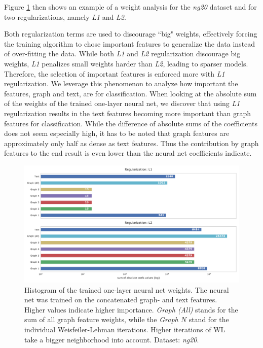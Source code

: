 Figure \ref{fig:combined_coefs_l1_l2_regularization} then shows an example of a weight analysis for the \textit{ng20} dataset and for two regularizations, namely \textit{L1} and \textit{L2}.

Both regularization terms are used to discourage ``big" weights, effectively forcing the training algorithm to chose important features to generalize the data instead of over-fitting the data.
While both \textit{L1} and \textit{L2} regularization discourage big weights, \textit{L1} penalizes small weights harder than \textit{L2}, leading to sparser models.
Therefore, the selection of important features is enforced more with \textit{L1} regularization.
We leverage this phenomenon to analyze how important the features, graph and text, are for classification.
When looking at the absolute sum of the weights of the trained one-layer neural net, we discover that using \textit{L1} regularization results in the text features becoming more important than graph features for classification.
While the difference of absolute sums of the coefficients does not seem especially high, it has to be noted that graph features are approximately only half as dense as text features.
Thus the contribution by graph features to the end result is even lower than the neural net coefficients indicate.

\begin{figure}[htb!]
	\centering
	{\includegraphics[width=\linewidth]{assets/figures/combined_coefs_l1_l2_regularization.pdf}%
		\caption[Statistics: Histogram of the trained weights of a one-layer neural net]{%
			Histogram of the trained one-layer neural net weights. The neural net was trained on the concatenated graph- and text features.
			Higher values indicate higher importance.
			\textit{Graph (All)} stands for the sum of all graph feature weights, while the \textit{Graph $N$} stand for the individual Weisfeiler-Lehman iterations.
			Higher iterations of WL take a bigger neighborhood into account.
			Dataset: \textit{ng20}.
		}%
		\label{fig:combined_coefs_l1_l2_regularization}}
\end{figure}

